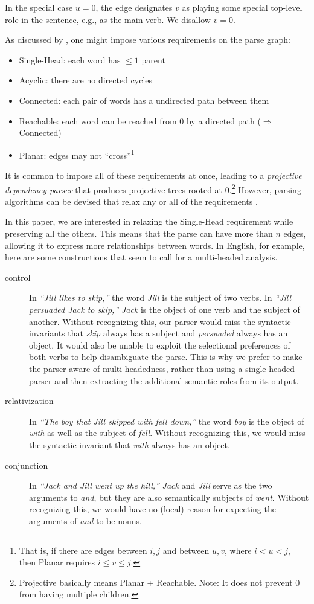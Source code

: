 \documentclass[a4paper,11pt]{article}
\begin{document}
In the special case $u=0$, the edge designates $v$ as playing some special top-level role in the sentence, e.g., as the main verb.  We disallow $v=0$.

As discussed by \cite{kuhlmann-nivre-2006,gomezrodriguez-nivre-2013}, one might impose various requirements on the parse graph:
\begin{itemize}[noitemsep]
\item {\sc Single-Head}: each word has $\leq 1$ parent
\item {\sc Acyclic}: there are no directed cycles
\item {\sc Connected}: each pair of words has a undirected path between them
\item {\sc Reachable}: each word can be reached from 0 by a directed path ($\Rightarrow$ {\sc Connected})
\item {\sc Planar}: edges may not ``cross''\footnote{That is, if there are edges between $i,j$ and between $u,v$, where $i < u < j$, then {\sc Planar} requires $i \leq v \leq j$.}
\end{itemize}
It is common to impose all of these requirements at once, leading to a {\em projective dependency parser} that produces projective trees rooted at 0.\footnote{{\sc Projective} basically means {\sc Planar} + {\sc Reachable}.  Note: It does not prevent 0 from having multiple children.}  However, parsing algorithms can be devised that relax any or all of the requirements \cite{gomezrodriguez-nivre-2013}.  

In this paper, we are interested in relaxing the {\sc Single-Head} requirement while preserving all the others.  This means that the parse can have more than $n$ edges, allowing it to express more relationships between words.  In English, for example, here are some constructions that seem to call for a multi-headed analysis.  
\begin{description}
\item[control] In {\em ``Jill likes to skip,''} the word {\em Jill} is the subject of two verbs.  In {\em ``Jill persuaded Jack to skip,''} {\em Jack} is the object of one verb and the subject of another.  Without recognizing this, our parser would miss the syntactic invariants that {\em skip} always has a subject and {\em persuaded} always has an object.  It would also be unable to exploit the selectional preferences of both verbs to help disambiguate the parse.  This is why we prefer to make the parser aware of multi-headedness, rather than using a single-headed parser and then extracting the additional semantic roles from its output.
\item[relativization] In {\em ``The boy that Jill skipped with fell down,''} the word {\em boy} is the object of {\em with} as well as the subject of {\em fell}.  Without recognizing this, we would miss the syntactic invariant that {\em with} always has an object.  
\item[conjunction] In {\em ``Jack and Jill went up the hill,''} {\em Jack} and {\em Jill} serve as the two arguments to {\em and}, but they are also semantically subjects of {\em went}.  Without recognizing this, we would have no (local) reason for expecting the arguments of {\em and} to be nouns.
\end{description}
\end{document}
